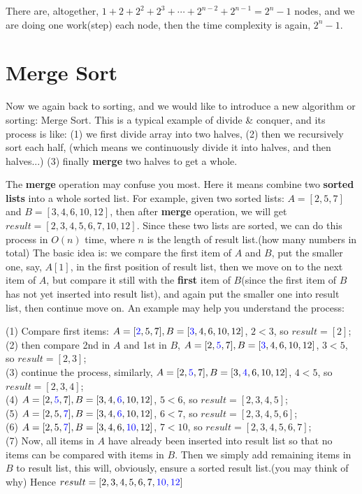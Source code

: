 \begin{spacing}{1.3}
    There are, altogether, $1+2+2^2+2^3+\cdots + 2^{n-2}+2^{n-1}
    =2^n-1$ nodes, and we are doing one work(step) each node,
    then the time complexity is again, $2^n-1$.

    \newpage
    \section{Merge Sort}

    Now we again back to sorting, and we would like to introduce 
    a new algorithm or sorting: Merge Sort.
    This is a typical example of divide \& conquer, and 
    its process is like: (1) we first divide array into two halves,
    (2) then we recursively sort each half, (which means we 
    continuously divide it into halves, and then halves...)
    (3) finally {\bf merge} two halves to get a whole.

    The {\bf merge} operation may confuse you most. Here 
    it means combine two {\bf sorted lists} into a 
    whole sorted list. For example, given two sorted lists:
    $A=[2, 5, 7]$ and $B=[3, 4, 6, 10, 12]$, then after {\bf merge}
    operation, we will get $result=[2, 3, 4, 5, 6, 7, 10, 12]$.
    Since these two lists are sorted, we can do this process
    in $O(n)$ time, where $n$ is the length of result 
    list.(how many numbers in total) The basic idea is: 
    we compare the first item of $A$ and $B$, put the smaller 
    one, say, $A[1]$, in the first position of result list, then 
    we move on to the next item of $A$, but compare it still with 
    the {\bf first} item of $B$(since the first item of $B$
    has not yet inserted into result list), 
    and again put the smaller one into result list, then 
    continue move on. An example may help you understand the process:

    \noindent (1) Compare first items: $A=[{\color{blue} 2},5,7], B=[{\color{blue} 3},4,6,10,12]$, 
    $2<3$, so $result=[2]$;\\
    (2) then compare 2nd in $A$ and 1st in $B$, $A=[2, {\color{blue} 5},7], B=[{\color{blue} 3},4,6,10,12]$, 
    $3<5$, so $result=[2, 3]$;\\
    (3) continue the process, similarly, $A=[2, {\color{blue} 5},7], B=[3,{\color{blue} 4},6,10,12]$, 
    $4<5$, so $result=[2, 3, 4]$;\\
    (4) $A=[2, {\color{blue} 5},7], B=[3,4,{\color{blue} 6},10,12]$, 
    $5<6$, so $result=[2, 3, 4, 5]$;\\
    (5) $A=[2, 5,{\color{blue} 7}], B=[3,4,{\color{blue} 6},10,12]$, 
    $6<7$, so $result=[2, 3, 4, 5, 6]$;\\
    (6) $A=[2, 5,{\color{blue} 7}], B=[3,4,6,{\color{blue} 10},12]$, 
    $7<10$, so $result=[2, 3, 4, 5, 6, 7]$;\\
    (7) Now, all items in $A$ have already been inserted into result 
    list so that no items can be compared with items in $B$.
    Then we simply add remaining items in $B$ to result list,
    this will, obviously, ensure a sorted result list.(you may think of why)
    Hence $result=[2,3,4,5,6,7,{\color{blue} 10,12}]$


\end{spacing}
